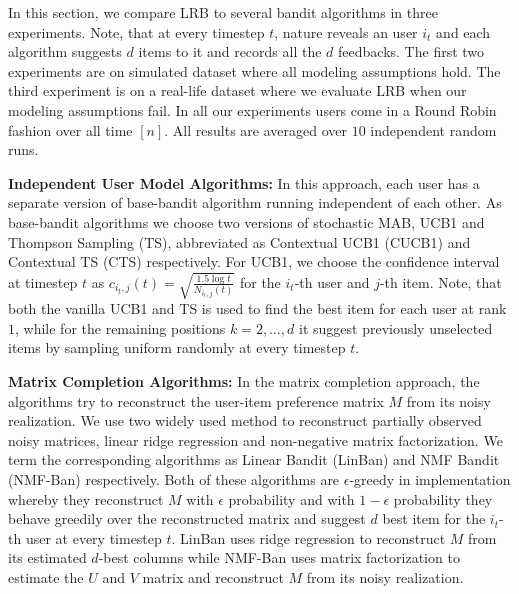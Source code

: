 In this section, we compare LRB to several bandit algorithms in three experiments. Note, that at every timestep $t$, nature reveals an user $i_t$ and each algorithm suggests $d$ items to it and records all the $d$ feedbacks.  The first two experiments are on simulated dataset where all modeling assumptions hold. The third experiment is on a real-life dataset where we evaluate LRB when our modeling assumptions fail.  In all our experiments users come in a Round Robin fashion over all time $[n]$.  All results are averaged over $10$ independent random runs.


\textbf{Independent User Model Algorithms:} In this approach, each user has a separate version of base-bandit algorithm running independent of each other. As base-bandit algorithms we choose two versions of stochastic MAB, UCB1 and Thompson Sampling (TS), abbreviated as Contextual UCB1 (CUCB1) and Contextual TS (CTS) respectively. For UCB1, we choose the confidence interval at timestep $t$ as $c_{i_t, j}(t) = \sqrt{\frac{1.5 \log t}{N_{i_t,j}(t)}}$ for the $i_t$-th user and $j$-th item. Note, that both the vanilla UCB1 and TS is used to find the best item for each user at rank $1$, while for the remaining positions $k= 2,\dots, d$ it suggest previously unselected items by sampling uniform randomly at every timestep $t$. 


\textbf{Matrix Completion Algorithms:} In the matrix completion approach, the algorithms try to reconstruct the user-item preference matrix $M$ from its noisy realization. We use two widely used method to reconstruct partially observed noisy matrices, linear ridge regression and non-negative matrix factorization. We term the corresponding algorithms as Linear Bandit (LinBan) and NMF Bandit (NMF-Ban) respectively. Both of these algorithms are $\epsilon$-greedy in implementation whereby they reconstruct $M$ with $\epsilon$ probability and with $1-\epsilon$ probability they behave greedily over the reconstructed matrix and suggest $d$ best item for the $i_t$-th user at every timestep $t$. LinBan uses ridge regression to reconstruct $M$ from its estimated $d$-best columns while NMF-Ban uses matrix factorization to estimate the $U$ and $V$ matrix and reconstruct $M$ from its noisy realization. 


